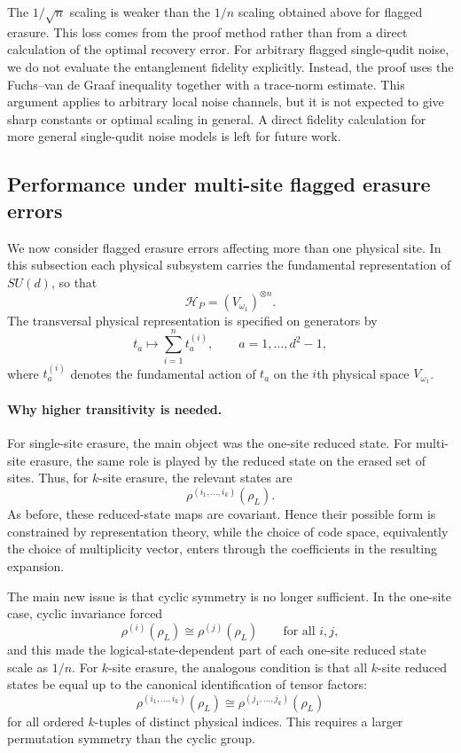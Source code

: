 \documentclass[10pt,twocolumn,superscriptaddress,aps,amsmath,amssymb,citeautoscript,floatfix,prx]{revtex4-2}
\theoremstyle{plain}
\theoremstyle{plain}
\theoremstyle{plain}
\theoremstyle{plain}
\theoremstyle{plain}
\theoremstyle{plain}
\begin{document}
The $1/\sqrt n$ scaling is weaker than the $1/n$ scaling obtained above for flagged erasure. This loss comes from the proof method rather than from a direct calculation of the optimal recovery error. For arbitrary flagged single-qudit noise, we do not evaluate the entanglement fidelity explicitly. Instead, the proof uses the Fuchs--van de Graaf inequality together with a trace-norm estimate. This argument applies to arbitrary local noise channels, but it is not expected to give sharp constants or optimal scaling in general. A direct fidelity calculation for more general single-qudit noise models is left for future work.

\subsection{Performance under multi-site flagged erasure errors}\label{subsec:main_muti_erasure_noise}

We now consider flagged erasure errors affecting more than one physical site. In this subsection each physical subsystem carries the fundamental representation of $SU(d)$, so that
$$
\mathcal H_P=(V_{\omega_1})^{\otimes n}.
$$
The transversal physical representation is specified on generators by
$$
t_a
\longmapsto
\sum_{i=1}^n t_a^{(i)},
\qquad
a=1,\ldots,d^2-1,
$$
where $t_a^{(i)}$ denotes the fundamental action of $t_a$ on the $i$th physical space $V_{\omega_1}$.

\paragraph{Why higher transitivity is needed.}

For single-site erasure, the main object was the one-site reduced state. For multi-site erasure, the same role is played by the reduced state on the erased set of sites. Thus, for $k$-site erasure, the relevant states are
$$
\rho^{(i_1,\ldots,i_k)}(\rho_L).
$$
As before, these reduced-state maps are covariant. Hence their possible form is constrained by representation theory, while the choice of code space, equivalently the choice of multiplicity vector, enters through the coefficients in the resulting expansion.

The main new issue is that cyclic symmetry is no longer sufficient. In the one-site case, cyclic invariance forced
$$
\rho^{(i)}(\rho_L)
\cong
\rho^{(j)}(\rho_L)
\qquad
\text{for all } i,j,
$$
and this made the logical-state-dependent part of each one-site reduced state scale as $1/n$. For $k$-site erasure, the analogous condition is that all $k$-site reduced states be equal up to the canonical identification of tensor factors:
$$
\rho^{(i_1,\ldots,i_k)}(\rho_L)
\cong
\rho^{(j_1,\ldots,j_k)}(\rho_L)
$$
for all ordered $k$-tuples of distinct physical indices. This requires a larger permutation symmetry than the cyclic group.
\end{document}

